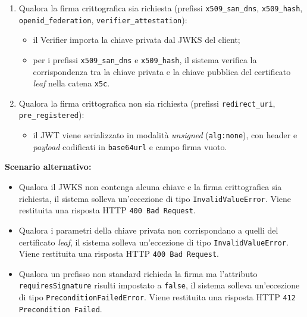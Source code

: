 \begin{enumerate}
    \item Qualora la firma crittografica sia richiesta (prefissi \texttt{x509\_\allowbreak{}san\_\allowbreak{}dns}, \texttt{x509\_\allowbreak{}hash}, \texttt{openid\_\allowbreak{}federation}, \texttt{verifier\_\allowbreak{}attestation}):
    \begin{itemize}
        \item il Verifier importa la chiave privata dal JWKS del client;
        \item per i prefissi \texttt{x509\_\allowbreak{}san\_\allowbreak{}dns} e \texttt{x509\_\allowbreak{}hash}, il sistema verifica la corrispondenza tra la chiave privata e la chiave pubblica del certificato \textit{leaf} nella catena \texttt{x5c}.
    \end{itemize}
    \item Qualora la firma crittografica non sia richiesta (prefissi \texttt{redirect\_\allowbreak{}uri}, \texttt{pre\_\allowbreak{}registered}):
    \begin{itemize}
        \item il JWT viene serializzato in modalità \textit{unsigned} (\texttt{alg:none}), con header e \textit{payload} codificati in \texttt{base64url} e campo firma vuoto.
    \end{itemize}
\end{enumerate}
\noindent\textbf{Scenario alternativo:}
\begin{itemize}
    \item Qualora il JWKS non contenga alcuna chiave e la firma crittografica sia richiesta, il sistema solleva un'eccezione di tipo \texttt{InvalidValueError}. Viene restituita una risposta HTTP \texttt{400 Bad Request}.
    \item Qualora i parametri della chiave privata non corrispondano a quelli del certificato \textit{leaf}, il sistema solleva un'eccezione di tipo \texttt{InvalidValueError}. Viene restituita una risposta HTTP \texttt{400 Bad Request}.
    \item Qualora un prefisso non standard richieda la firma ma l'attributo \texttt{requiresSignature} risulti impostato a \texttt{false}, il sistema solleva un'eccezione di tipo \texttt{PreconditionFailedError}. Viene restituita una risposta HTTP \texttt{412 Precondition Failed}.
\end{itemize}

